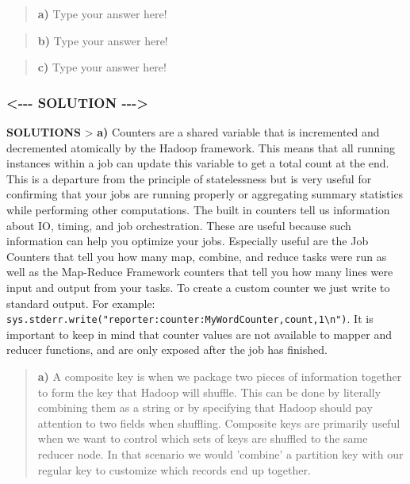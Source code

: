\documentclass[11pt]{article}
\begin{document}
\begin{quote}
\textbf{a)} Type your answer here!
\end{quote}

\begin{quote}
\textbf{b)} Type your answer here!
\end{quote}

\begin{quote}
\textbf{c)} Type your answer here!
\end{quote}

    \subsubsection{\textless{}-\/-\/- SOLUTION
-\/-\/-\textgreater{}}\label{solution----}

\textbf{SOLUTIONS} \textgreater{} \textbf{a)} Counters are a shared
variable that is incremented and decremented atomically by the Hadoop
framework. This means that all running instances within a job can update
this variable to get a total count at the end. This is a departure from
the principle of statelessness but is very useful for confirming that
your jobs are running properly or aggregating summary statistics while
performing other computations. The built in counters tell us information
about IO, timing, and job orchestration. These are useful because such
information can help you optimize your jobs. Especially useful are the
Job Counters that tell you how many map, combine, and reduce tasks were
run as well as the Map-Reduce Framework counters that tell you how many
lines were input and output from your tasks. To create a custom counter
we just write to standard output. For example:
\texttt{sys.stderr.write("reporter:counter:MyWordCounter,count,1\textbackslash{}n")}.
It is important to keep in mind that counter values are not available to
mapper and reducer functions, and are only exposed after the job has
finished.

\begin{quote}
\textbf{a)} A composite key is when we package two pieces of information
together to form the key that Hadoop will shuffle. This can be done by
literally combining them as a string or by specifying that Hadoop should
pay attention to two fields when shuffling. Composite keys are primarily
useful when we want to control which sets of keys are shuffled to the
same reducer node. In that scenario we would 'combine' a partition key
with our regular key to customize which records end up together.
\end{quote}
\end{document}
